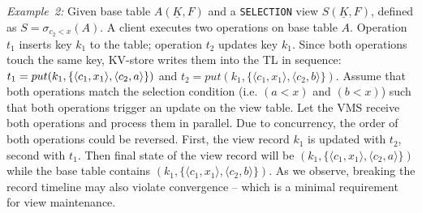 \noindent
\textit{Example~2:} Given base table $A(\underline{K}, F)$ and a 
\texttt{SELECTION} view $S(\underline{K}, F)$, defined as 
$S=\sigma_{c_2 < x}(A)$. A client 
executes two operations on base table $A$. Operation $t_1$ inserts key 
$k_1$ to the table; operation $t_2$ updates key $k_1$. Since both operations
touch the same key, KV-store writes them into the TL in sequence: 
$t_1=put(k_1,\{\langle c_1,x_1\rangle, \linebreak\langle c_2,a\rangle\})$ and 
$t_2=put(k_1, \{\langle c_1,x_1 \rangle, \langle c_2,b\rangle\})$. Assume 
that both operations match the selection condition (i.e. $(a < x)$ and $(b < x)$) 
such that both operations trigger an update on the view table. Let 
the VMS receive both operations and process them in parallel. Due to  
concurrency, the order of both operations could be reversed. First, the
view record $k_1$ is updated with $t_2$, second with $t_1$. Then final
state of the view record will be  $(k_1, \{\langle c_1,x_1 \rangle,\langle 
c_2,a\rangle\})$ while the base table contains $(k_1, \{\langle c_1,x_1 \rangle,\langle 
c_2,b\rangle\})$. As we observe, breaking the record timeline may also 
violate convergence -- which is a minimal requirement for view maintenance. 


%

%
%


